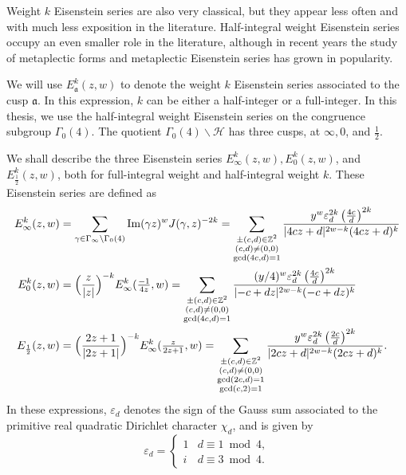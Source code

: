 Weight $k$ Eisenstein series are also very classical, but they appear less often and
with much less exposition in the literature.
Half-integral weight Eisenstein series occupy an even smaller role in the literature,
although in recent years the study of metaplectic forms and metaplectic Eisenstein series
has grown in popularity.


We will use $E_\mathfrak{a}^k(z,w)$ to denote the weight $k$ Eisenstein series associated
to the cusp $\mathfrak{a}$.
In this expression, $k$ can be either a half-integer or a full-integer.
In this thesis, we use the half-integral weight Eisenstein series on the congruence
subgroup $\Gamma_0(4)$.
The quotient $\Gamma_0(4) \backslash \mathcal{H}$ has three cusps, at $\infty, 0$, and
$\frac{1}{2}$.


We shall describe the three Eisenstein series $E^k_\infty(z,w), E^k_0(z,w)$, and
$E^k_{\frac{1}{2}}(z,w)$, both for full-integral weight and half-integral weight $k$.
These Eisenstein series are defined as
\begin{align}
  E_\infty^k(z,w) &= \sum_{\gamma \in \Gamma_\infty \backslash \Gamma_0(4)} \operatorname{Im}(\gamma
  z)^w J(\gamma, z)^{-2k}
  =
  \sum_{\substack{\pm (c,d) \in \mathbb{Z}^2 \\ (c,d) \neq (0,0) \\ \gcd(4c,d) = 1}}
  \frac{y^w \varepsilon_d^{2k} \left(\frac{4c}{d}\right)^{2k}}{\lvert 4cz + d \rvert^{2w-k}(4cz+d)^k}
  \\
  E_0^k(z,w) &= \Big( \frac{z}{\lvert z \rvert} \Big)^{-k} E_\infty^k(\tfrac{-1}{4z}, w)
  =
  \sum_{\substack{\pm(c,d) \in \mathbb{Z}^2 \\ (c,d) \neq (0,0) \\ \gcd(4c, d) = 1}}
  \frac{(y/4)^w \varepsilon_d^{2k} \left(\frac{4c}{d}\right)^{2k}}{\lvert -c + dz \rvert^{2w - k} (-c +
  dz)^k}
  \\
  E_{\frac{1}{2}}(z,w) &= \Big( \frac{2z+1}{\lvert 2z+1 \rvert} \Big)^{-k}
  E_\infty^k(\tfrac{z}{2z+1}, w) =
  \sum_{\substack{\pm(c,d) \in \mathbb{Z}^2 \\ (c,d) \neq (0,0) \\ \gcd(2c, d) = 1 \\
  \gcd(c,2) = 1}} \frac{y^w \varepsilon_d^{2k} \left(\frac{2c}{d}\right)^{2k}}{\lvert 2cz+d \rvert^{2w -
  k}(2cz+d)^k}.
\end{align}
In these expressions, $\varepsilon_d$ denotes the sign of the Gauss sum associated to the
primitive real quadratic Dirichlet character $\chi_d$, and is given by
\begin{equation}
  \varepsilon_d = \begin{cases}
    1 & d \equiv 1 \bmod 4, \\
    i & d \equiv 3 \bmod 4.
  \end{cases}
\end{equation}
